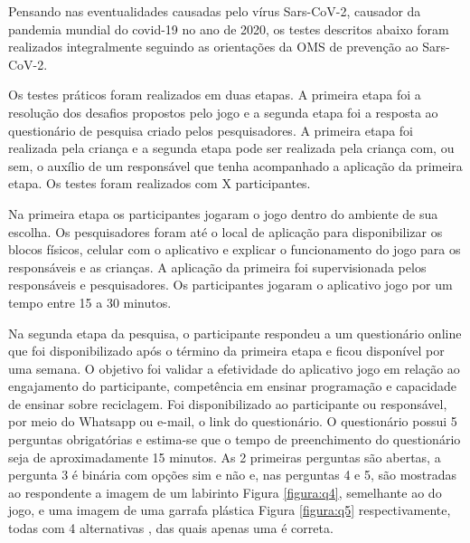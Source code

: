 Pensando nas eventualidades causadas pelo vírus Sars-CoV-2, causador da pandemia mundial do covid-19 no ano de 2020, os testes descritos abaixo foram realizados integralmente seguindo as orientações da OMS \cite{oms_2020} de prevenção ao Sars-CoV-2.

Os testes práticos foram realizados em duas etapas. A primeira etapa foi a resolução dos desafios propostos pelo jogo e a segunda etapa foi a resposta ao questionário de pesquisa criado pelos pesquisadores. A primeira etapa foi realizada pela criança e a segunda etapa pode ser realizada pela criança com, ou sem, o auxílio de um responsável que tenha acompanhado a aplicação da primeira etapa. Os testes foram realizados com X participantes.

Na primeira etapa os participantes jogaram o jogo dentro do ambiente de sua escolha. Os pesquisadores foram até o local de aplicação para disponibilizar os blocos físicos, celular com o aplicativo e explicar o funcionamento do jogo para os responsáveis e as crianças. A aplicação da primeira foi supervisionada pelos responsáveis e pesquisadores. Os participantes jogaram o  aplicativo jogo por um tempo entre 15 a 30 minutos.

Na segunda etapa da pesquisa, o participante respondeu  a um questionário online que foi disponibilizado após o término da primeira etapa e ficou disponível por uma semana. O objetivo foi  validar a efetividade do aplicativo jogo em relação ao engajamento do participante, competência em ensinar programação e
capacidade de ensinar sobre reciclagem. Foi disponibilizado ao participante ou responsável, por meio do Whatsapp ou e-mail, o link do questionário. O questionário possui 5 perguntas obrigatórias e estima-se que o tempo de preenchimento do questionário seja de aproximadamente 15 minutos. As 2 primeiras perguntas são abertas, a pergunta 3 é binária com opções sim e não  e, nas perguntas 4 e 5, são mostradas ao respondente a imagem de um labirinto Figura \ref{figura:q4}, semelhante ao do jogo, e uma imagem de uma garrafa plástica Figura \ref{figura:q5} respectivamente, todas com 4 alternativas , das quais apenas uma é correta. 

